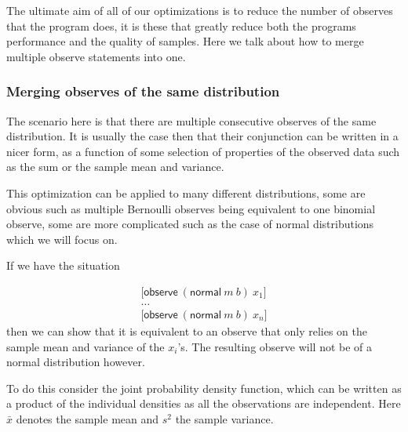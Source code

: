 \documentclass[a4paper]{article}
\begin{document}
The ultimate aim of all of our optimizations is to reduce the number of observes that the program does, it is these that greatly reduce both the programs performance and the quality of samples. Here we talk about how to merge multiple observe statements into one.




\subsubsection{Merging observes of the same distribution}

The scenario here is that there are multiple consecutive observes of the same distribution. It is usually the case then that their conjunction can be written in a nicer form, as a function of some selection of properties of the observed data such as the sum or the sample mean and variance.

This optimization can be applied to many different distributions, some are obvious such as multiple Bernoulli observes being equivalent to one binomial observe, some are more complicated such as the case of normal distributions which we will focus on.

If we have the situation

\[
	\begin{array}{l}
		\lbrack \mathsf{observe}\ (\mathsf{normal}\ m\ b)\ x_1 \rbrack \\
		\dots \\
		\lbrack \mathsf{observe}\ (\mathsf{normal}\ m\ b)\ x_n \rbrack
	\end{array}
\]
then we can show that it is equivalent to an observe that only relies on the sample mean and variance of the \(x_i\)'s. The resulting observe will not be of a normal distribution however.

To do this consider the joint probability density function, which can be written as a product of the individual densities as all the observations are independent. Here \(\bar{x}\) denotes the sample mean and \(s^2\) the sample variance.
\end{document}
